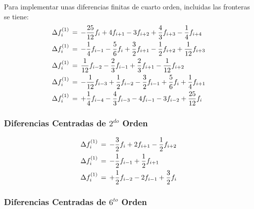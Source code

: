 \documentclass[9pt,technote,twoside,letterpaper,onecolumn]{IEEEtran}
\begin{document}
\begin{multicols}{2}
Para implementar unas diferencias finitas de cuarto orden, incluidas las fronteras se tiene:
\begin{align} %
  \Delta f^{(1)}_i\,&=\,-\frac{25}{12}f_{i}+4f_{i+1}-3f_{i+2}+\frac{4}{3}f_{i+3}-\frac{1}{4}f_{i+4}\notag\\
  \Delta f^{(1)}_i\,&=\,-\frac{1}{4}f_{i-1}-\frac{5}{6}f_{i}+\frac{3}{2}f_{i+1}-\frac{1}{2}f_{i+2}+\frac{1}{12}f_{i+3}\notag\\
  \Delta f^{(1)}_i\,&=\,\frac{1}{12}f_{i-2}-\frac{2}{3}f_{i-1}+\frac{2}{3}f_{i+1}-\frac{1}{12}f_{i+2}\\
  \Delta f^{(1)}_i\,&=\,-\frac{1}{12}f_{i-3}+\frac{1}{2}f_{i-2}-\frac{3}{2}f_{i-1}+\frac{5}{6}f_{i}+\frac{1}{4}f_{i+1}\notag\\
  \Delta f^{(1)}_i\,&=\,+\frac{1}{4}f_{i-4}-\frac{4}{3}f_{i-3}-4f_{i-1}-3f_{i-2}+\frac{25}{12}f_{i}\notag
\end{align}

\subsubsection{Diferencias Centradas de $2^{do}$ Orden}
\label{sec:cds2}
\begin{align} %
  \Delta f^{(1)}_i\,&=\,-\frac{3}{2}f_{i}+2f_{i+1}-\frac{1}{2}f_{i+2}\notag\\
  \Delta f^{(1)}_i\,&=\,-\frac{1}{2}f_{i-1}+\frac{1}{2}f_{i+1}\\
  \Delta f^{(1)}_i\,&=\,+\frac{1}{2}f_{i-2}-2f_{i-1}+\frac{3}{2}f_{i}\notag
\end{align}

\subsubsection{Diferencias Centradas de $6^{to}$ Orden}
\label{sec:cds6}


\end{multicols}
\end{document}
